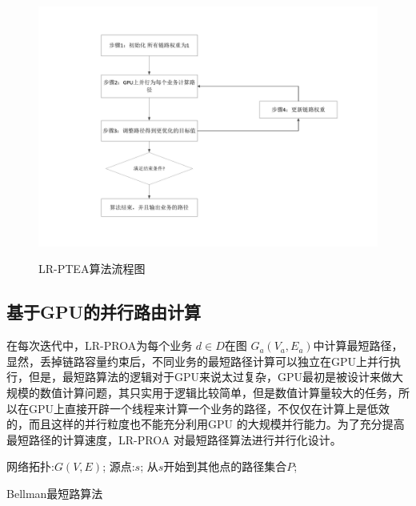 \begin{figure}
  \begin{center}
    {\includegraphics[width=1\textwidth]{figures/lagrange.pdf}}
    \end{center}
  \caption{{\footnotesize{LR-PTEA算法流程图}}}
  \label{lpl}
\end{figure}
\subsection{基于GPU的并行路由计算}
  在每次迭代中，LR-PROA为每个业务 $d \in D$在图 $G_a(V_a, E_a)$中计算最短路径，显然，丢掉链路容量约束后，不同业务的最短路径计算可以独立在GPU上并行执行，但是，最短路算法的逻辑对于GPU来说太过复杂，GPU最初是被设计来做大规模的数值计算问题，其只实用于逻辑比较简单，但是数值计算量较大的任务，所以在GPU上直接开辟一个线程来计算一个业务的路径，不仅仅在计算上是低效的，而且这样的并行粒度也不能充分利用GPU 的大规模并行能力。为了充分提高最短路径的计算速度，LR-PROA 对最短路径算法进行并行化设计。
\begin{algorithm}[htb]
\begin{algorithmic}[1]
\Require
网络拓扑:$G(V, E)$;
源点:$s$;
\Ensure
从$s$开始到其他点的路径集合$P$;
\EndFor
{}
\EndIf
\EndFor
\EndWhile
{}
\end{algorithmic}
\caption{{Bellman最短路算法}}
\label{Bellman}
\end{algorithm}
  

